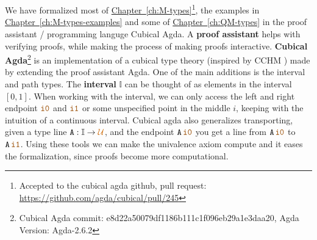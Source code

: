 \documentclass[twoside,11pt,openright]{report}
\theoremstyle{plain} %
\theoremstyle{definition}
\theoremstyle{remark}
\newcommand*{\chapterref}[1]{\hyperref[ch:#1]{Chapter~\ref*{ch:#1}}}
\newcommand*{\universe}[1]{\textcolor{orange!80!black}{#1}}
\newcommand*{\constant}[1]{\textcolor{orange!60!black}{\ensuremath{\mathtt{#1}}}}
\newcommand*{\typeformer}[1]{\ensuremath{\mathtt{#1}}}
\begin{document}
\\ \\
We have formalized most of \chapterref{M-types}\footnote{Accepted to the cubical agda github, pull request: \url{https://github.com/agda/cubical/pull/245}}, the examples in \chapterref{M-types-examples} and some of \chapterref{QM-types} in the proof assistant / programming languge Cubical Agda. A \textbf{proof assistant} helps with verifying proofs, while making the process of making proofs interactive. \textbf{Cubical Agda}\footnote{Cubical Agda commit: e8d22a50079df1186b111c1f096eb29a1e3daa20, Agda Version: Agda-2.6.2} \cite{cubicalagda} is an implementation of a cubical type theory (inspired by CCHM \cite{DBLP:CCHM}) made by extending the proof assistant Agda. One of the main additions is the interval and path types. The \textbf{interval} \(\mathbb{I}\) can be thought of as elements in the interval \([0,1]\). When working with the interval, we can only access the left and right endpoint \(\constant{i0}\) and \(\constant{i1}\) or some unspecified point in the middle \(i\), keeping with the intuition of a continuous interval. Cubical agda also generalizes transporting, given a type line \(\typeformer{A} : \mathbb{I} \rightarrow \universe{\mathcal{U}}\), and the endpoint \(\typeformer{A}\,\constant{i0}\) you get a line from \(\typeformer{A}\,\constant{i0}\) to \(\typeformer{A}\,\constant{i1}\). Using these tools we can make the univalence axiom compute and it eases the formalization, since proofs become more computational.
\end{document}
